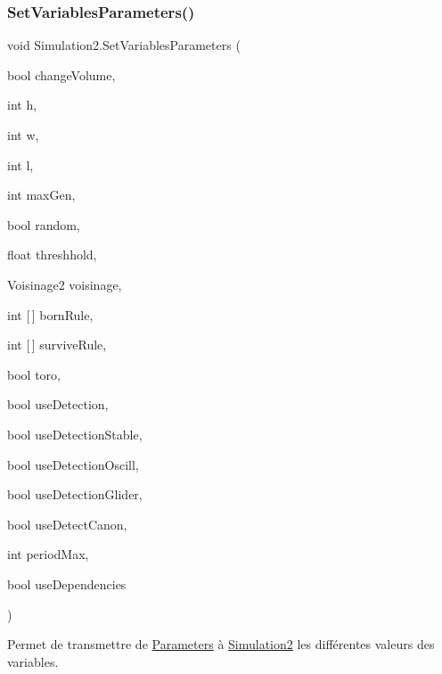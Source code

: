 \subsubsection{\texorpdfstring{Set\+Variables\+Parameters()}{SetVariablesParameters()}}
{\footnotesize\ttfamily void Simulation2.\+Set\+Variables\+Parameters (\begin{DoxyParamCaption}\item[{bool}]{change\+Volume,  }\item[{int}]{h,  }\item[{int}]{w,  }\item[{int}]{l,  }\item[{int}]{max\+Gen,  }\item[{bool}]{random,  }\item[{float}]{threshhold,  }\item[{Voisinage2}]{voisinage,  }\item[{int \mbox{[}$\,$\mbox{]}}]{born\+Rule,  }\item[{int \mbox{[}$\,$\mbox{]}}]{survive\+Rule,  }\item[{bool}]{toro,  }\item[{bool}]{use\+Detection,  }\item[{bool}]{use\+Detection\+Stable,  }\item[{bool}]{use\+Detection\+Oscill,  }\item[{bool}]{use\+Detection\+Glider,  }\item[{bool}]{use\+Detect\+Canon,  }\item[{int}]{period\+Max,  }\item[{bool}]{use\+Dependencies }\end{DoxyParamCaption})\hspace{0.3cm}{\ttfamily [inline]}}



Permet de transmettre de \mbox{\hyperlink{class_parameters}{Parameters}} à \mbox{\hyperlink{class_simulation2}{Simulation2}} les différentes valeurs des variables. 

